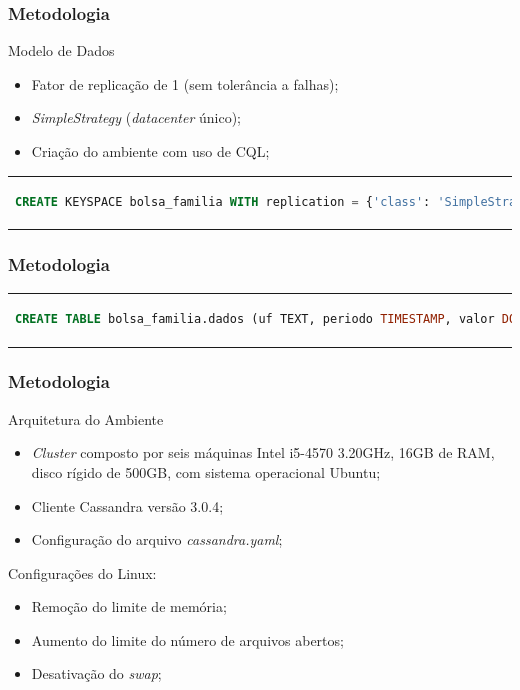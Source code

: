 \documentclass[brazil]{beamer}
\begin{document}
\begin{frame}[fragile]
	\frametitle{Metodologia}
	\begin{block}{Modelo de Dados}
		\begin{itemize}
			\item Fator de replicação de 1 (sem tolerância a falhas);
			\item \emph{SimpleStrategy} (\emph{datacenter} único);
			\item Criação do ambiente com uso de CQL;
		\end{itemize}
	
		\begin{tabular}{c}
		\begin{lstlisting}[caption={Código CQL para criação do keyspace},label={lst:cql_create_table},language=SQL]
		CREATE KEYSPACE bolsa_familia WITH replication = {'class': 'SimpleStrategy', 'replication_factor': 1};
		\end{lstlisting}
		\end{tabular}
	\end{block}
\end{frame}

\begin{frame}[fragile]
	\frametitle{Metodologia}
		\begin{tabular}{c}
		\begin{lstlisting}[caption={Código CQL para criação da tabela},label={lst:cql_create_table},language=SQL]
			CREATE TABLE bolsa_familia.dados (uf TEXT, periodo TIMESTAMP, valor DOUBLE, nis_favorecido BIGINT, cod_municipio INT, fonte TEXT, nome_favorecido TEXT, nome_municipio TEXT, PRIMARY KEY(nis_favorecido, periodo, valor));
		\end{lstlisting}
		\end{tabular}
\end{frame}

\begin{frame}
	\frametitle{Metodologia}

	\begin{block}{Arquitetura do Ambiente}
		\begin{itemize}
			\item \emph{Cluster} composto por seis máquinas Intel i5-4570 3.20GHz, 16GB de RAM, disco rígido de 500GB, com sistema operacional Ubuntu;
			\item Cliente Cassandra versão 3.0.4;
			\item Configuração do arquivo \emph{cassandra.yaml};
		\end{itemize}
	
		Configurações do Linux:
		\begin{itemize}
			\item Remoção do limite de memória;
			\item Aumento do limite do número de arquivos abertos;
			\item Desativação do \emph{swap};
		\end{itemize}
	\end{block}
\end{frame}	
\end{document}
